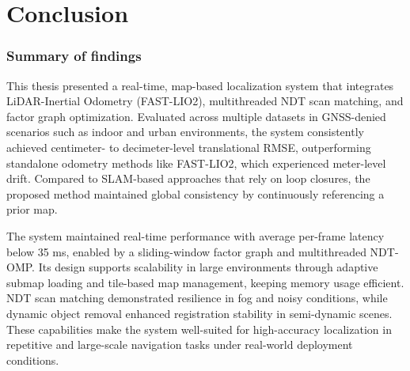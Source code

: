 \chapter{Conclusion}
\label{ch:sum}

\subsection{Summary of findings}
This thesis presented a real-time, map-based localization system that integrates LiDAR-Inertial Odometry (FAST-LIO2), multithreaded NDT scan matching, and factor graph optimization. Evaluated across multiple datasets in GNSS-denied scenarios such as indoor and urban environments, the system consistently achieved centimeter- to decimeter-level translational RMSE, outperforming standalone odometry methods like FAST-LIO2, which experienced meter-level drift. Compared to SLAM-based approaches that rely on loop closures, the proposed method maintained global consistency by continuously referencing a prior map.

The system maintained real-time performance with average per-frame latency below 35 ms, enabled by a sliding-window factor graph and multithreaded NDT-OMP. Its design supports scalability in large environments through adaptive submap loading and tile-based map management, keeping memory usage efficient. NDT scan matching demonstrated resilience in fog and noisy conditions, while dynamic object removal enhanced registration stability in semi-dynamic scenes. These capabilities make the system well-suited for high-accuracy localization in repetitive and large-scale navigation tasks under real-world deployment conditions.